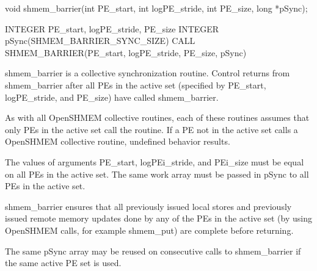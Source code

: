 
\synC
	  void shmem_barrier(int PE_start, int logPE_stride, int PE_size, long *pSync);

\synF
	  INTEGER PE_start, logPE_stride, PE_size
	  INTEGER pSync(SHMEM_BARRIER_SYNC_SIZE)
	  CALL SHMEM_BARRIER(PE_start, logPE_stride, PE_size, pSync)


{
       shmem\_barrier is a collective synchronization routine.  Control returns
       from shmem\_barrier after all  PEs  in  the  active  set	(specified  by
       PE\_start, logPE\_stride, and PE\_size) have called shmem\_barrier.

       As  with	 all OpenSHMEM collective routines, each of these routines assumes
       that only PEs in the active set call the routine.  If a PE not  in  the
       active  set  calls  a  OpenSHMEM  collective	 routine,  undefined  behavior
       results.

       The  values  of	arguments  PE\_start, logPEi\_stride, and PEi\_size must be
       equal on all PEs in the active set.  The same work array must be passed
       in pSync to all PEs in the active set.

       shmem\_barrier  ensures  that  all  previously  issued  local stores and
       previously issued remote memory updates done by any of the PEs  in  the
       active  set  (by	 using	OpenSHMEM  calls,  for  example  shmem\_put) are
       complete before returning.

       The  same  pSync	 array	may  be	 reused	 on   consecutive   calls   to
       shmem\_barrier if the same active PE set is used.
}
